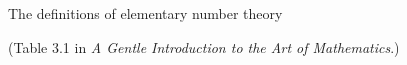 \documentclass{article}
\begin{document}
\thispagestyle{empty}

\centerline{\Large The definitions of elementary number theory}
\centerline{(Table 3.1 in {\em A Gentle Introduction to the Art of Mathematics}.)}



\end{document}
